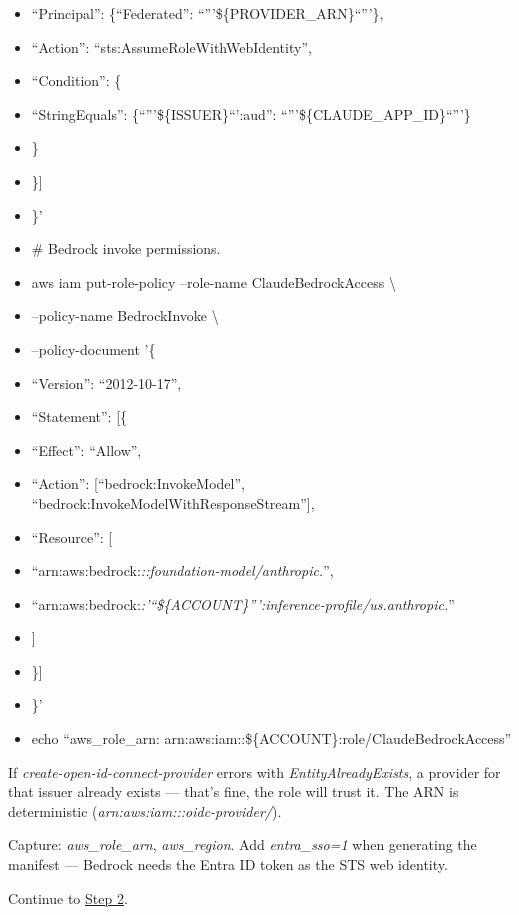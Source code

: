 \documentclass[11pt]{article}
\begin{document}
\begin{itemize}[leftmargin=*,itemsep=2pt,topsep=2pt]
\item {} ``Principal'': \{``Federated'': ``'''\$\{PROVIDER\_\allowbreak{}ARN\}``'''\},
\item {} ``Action'': ``sts:AssumeRoleWithWebIdentity'',
\item {} ``Condition'': \{
\item {} ``StringEquals'': \{``'''\$\{ISSUER\}``':aud'': ``'''\$\{CLAUDE\_\allowbreak{}APP\_\allowbreak{}ID\}``'''\}
\item {} \}
\item {} \}]
\item {} \}'
\item {} \# Bedrock invoke permissions.
\item {} aws iam put-role-policy --role-name ClaudeBedrockAccess \textbackslash{}
\item {} --policy-name BedrockInvoke \textbackslash{}
\item {} --policy-document '\{
\item {} ``Version'': ``2012-10-17'',
\item {} ``Statement'': [\{
\item {} ``Effect'': ``Allow'',
\item {} ``Action'': [``bedrock:InvokeModel'', ``bedrock:InvokeModelWithResponseStream''],
\item {} ``Resource'': [
\item {} ``arn:aws:bedrock:\emph{::foundation-model/anthropic.}'',
\item {} ``arn:aws:bedrock:\emph{:'``\$\{ACCOUNT\}''':inference-profile/us.anthropic.}''
\item {} ]
\item {} \}]
\item {} \}'
\item {} echo ``aws\_\allowbreak{}role\_\allowbreak{}arn: arn:aws:iam::\$\{ACCOUNT\}:role/ClaudeBedrockAccess''
\end{itemize}

If \emph{create-open-id-connect-provider} errors with \emph{EntityAlreadyExists}, a provider for that issuer already exists — that's fine, the role will trust it. The ARN is deterministic (\emph{arn:aws:iam:::oidc-provider/}).


Capture: \emph{aws\_\allowbreak{}role\_\allowbreak{}arn}, \emph{aws\_\allowbreak{}region}. Add \emph{entra\_\allowbreak{}sso=1} when generating the manifest — Bedrock needs the Entra ID token as the STS web identity.


Continue to \href{\#step-2--azure-admin-consent}{Step 2}.
\end{document}
